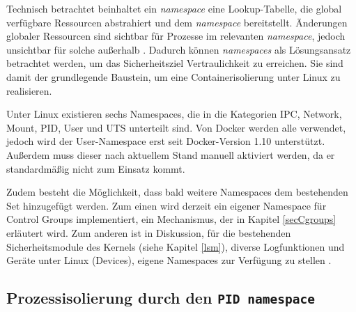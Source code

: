 \documentclass[../main.tex]{subfiles}
\begin{document}
		Technisch betrachtet beinhaltet ein \emph{namespace} eine Lookup-Tabelle, die global verfügbare Ressourcen abstrahiert und dem \emph{namespace} bereitstellt. Änderungen globaler Ressourcen sind sichtbar für Prozesse im relevanten \emph{namespace}, jedoch unsichtbar für solche außerhalb \cite[S.1+2]{IBMcheckpointRestart}\cite{namespaces}. Dadurch können \emph{namespaces} als Lösungsansatz betrachtet werden, um das Sicherheitsziel Vertraulichkeit zu erreichen. Sie sind damit der grundlegende Baustein, um eine Containerisolierung unter Linux zu realisieren.

		Unter Linux existieren sechs Namespaces, die in die Kategorien IPC, Network, Mount, PID, User und UTS unterteilt sind. Von Docker werden alle verwendet, jedoch wird der User-Namespace erst seit Docker-Version 1.10 unterstützt. Außerdem muss dieser nach aktuellem Stand manuell aktiviert werden, da er standardmäßig nicht zum Einsatz kommt.

		Zudem besteht die Möglichkeit, dass bald weitere Namespaces dem bestehenden Set hinzugefügt werden. Zum einen wird derzeit ein eigener Namespace für Control Groups implementiert, ein Mechanismus, der in Kapitel \ref{secCgroups} erläutert wird. Zum anderen ist in Diskussion, für die bestehenden Sicherheitsmodule des Kernels (siehe Kapitel \ref{lsm}), diverse Logfunktionen und Geräte unter Linux (Devices), eigene Namespaces zur Verfügung zu stellen \cite[S.19]{presContainerSec}.




		\subsection{Prozessisolierung durch den \texttt{\acrshort{PID} namespace}}
		\label{secIsoProcesses}
\end{document}
